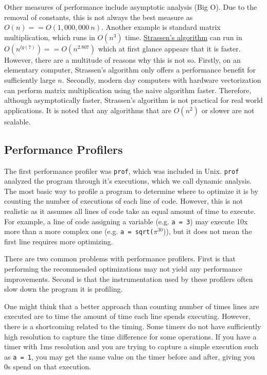 \documentclass[10pt]{article}
\begin{document}
Other measures of performance include asymptotic analysis (Big O).
Due to the removal of constants, this is not always the best measure as $O(n) == O(1,000,000~n)$. 
Another example is standard matrix multiplication, which runs in $O(n^{3})$ time. 
\href{https://en.wikipedia.org/wiki/Strassen_algorithm}{Strassen's algorithm} can run in $O(n^{lg(7)}) == O(n^{2.807})$ which at first glance appears that it is faster.
However, there are a multitude of reasons why this is not so.
Firstly, on an elementary computer, Strassen's algorithm only offers a performance benefit for sufficiently large $n$.
Secondly, modern day computers with hardware vectorization can perform matrix multiplication using the naive algorithm faster.
Therefore, although asymptotically faster, Strassen's algorithm is not practical for real world applications.
It is noted that any algorithms that are $O(n^{2})$ or slower are not scalable.\\


\subsection{Performance Profilers}
The first performance profiler was \texttt{prof}, which was included in Unix. 
\texttt{prof} analyzed the program through it's executions, which we call dynamic analysis. The most basic way to profile a program to determine where to optimize it is by counting the number of executions of each line of code. 
However, this is not realistic as it assumes all lines of code take an equal amount of time to execute. 
For example, a line of code assigning a variable (e.g. \texttt{a = 3}) may execute 10x more than a more complex one (e.g. \texttt{a = sqrt($\pi^{30}$})), but it does not mean the first line requires more optimizing.

There are two common problems with performance profilers. 
First is that performing the recommended optimizations may not yield any performance improvements. 
Second is that the instrumentation used by these profilers often slow down the program it is profiling. 

One might think that a better approach than counting number of times lines are executed are to time the amount of time each line spends executing. 
However, there is a shortcoming related to the timing. Some timers do not have sufficiently high resolution to capture the time difference for some operations. 
If you have a timer with 1ms resolution and you are trying to capture a simple execution such as \texttt{a = 1}, you may get the same value on the timer before and after, giving you 0s spend on that execution.
\end{document}

